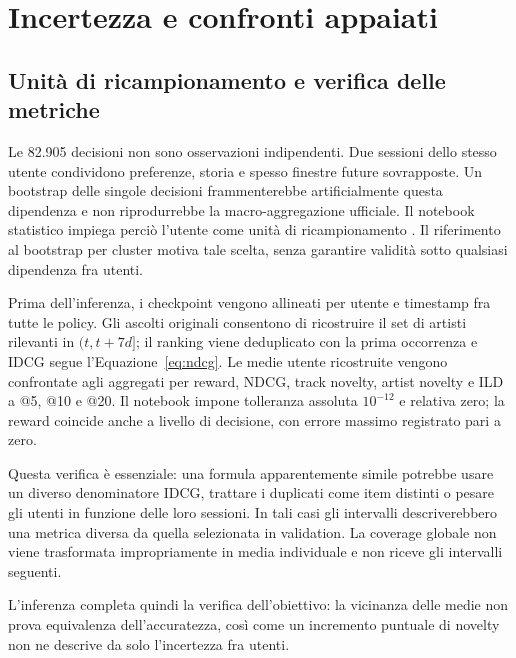 \chapter{Incertezza e confronti appaiati}\label{ch:stat}
\section{Unità di ricampionamento e verifica delle metriche}
Le 82.905 decisioni non sono osservazioni indipendenti. Due sessioni dello stesso utente condividono preferenze, storia e spesso finestre future sovrapposte. Un bootstrap delle singole decisioni frammenterebbe artificialmente questa dipendenza e non riprodurrebbe la macro-aggregazione ufficiale. Il notebook statistico impiega perciò l'utente come unità di ricampionamento \cite{efron1993,field2007}. Il riferimento al bootstrap per cluster motiva tale scelta, senza garantire validità sotto qualsiasi dipendenza fra utenti.

Prima dell'inferenza, i checkpoint vengono allineati per utente e timestamp fra tutte le policy. Gli ascolti originali consentono di ricostruire il set di artisti rilevanti in $(t,t+7d]$; il ranking viene deduplicato con la prima occorrenza e IDCG segue l'Equazione~\ref{eq:ndcg}. Le medie utente ricostruite vengono confrontate agli aggregati per reward, NDCG, track novelty, artist novelty e ILD a @5, @10 e @20. Il notebook impone tolleranza assoluta $10^{-12}$ e relativa zero; la reward coincide anche a livello di decisione, con errore massimo registrato pari a zero.

Questa verifica è essenziale: una formula apparentemente simile potrebbe usare un diverso denominatore IDCG, trattare i duplicati come item distinti o pesare gli utenti in funzione delle loro sessioni. In tali casi gli intervalli descriverebbero una metrica diversa da quella selezionata in validation. La coverage globale non viene trasformata impropriamente in media individuale e non riceve gli intervalli seguenti.

L'inferenza completa quindi la verifica dell'obiettivo: la vicinanza delle medie non prova equivalenza dell'accuratezza, così come un incremento puntuale di novelty non ne descrive da solo l'incertezza fra utenti.


